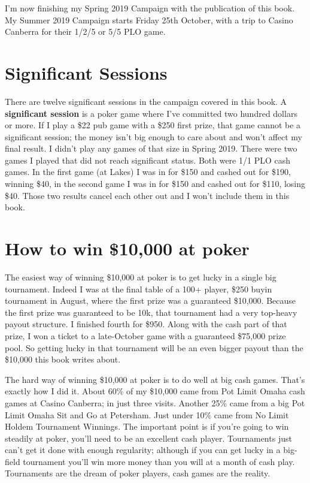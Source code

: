 I'm now finishing my Spring 2019 Campaign with the publication of this
book. My Summer 2019 Campaign starts Friday 25th October, with a trip
to Casino Canberra for their 1/2/5 or 5/5 PLO game.

\section*{Significant Sessions}


There are twelve significant sessions in the campaign covered in this
book. A \textbf{significant session} is a poker game where I've
committed two hundred dollars or more. If I play a \$22 pub game with
a \$250 first prize, that game cannot be a significant session; the
money isn't big enough to care about and won't affect my final
result. I didn't play any games of that size in Spring 2019. There
were two games I played that did not reach significant status. Both
were 1/1 PLO cash games. In the first game (at Lakes) I was in for
\$150 and cashed out for \$190, winning \$40, in the second game I was
in for \$150 and cashed out for \$110, losing \$40. Those two results
cancel each other out and I won't include them in this book.


\section*{How to win \$10,000 at poker}

The easiest way of winning \$10,000 at poker is to get lucky in a
single big tournament. Indeed I was at the final table of a 100+
player, \$250 buyin tournament in August, where the first prize was a
guaranteed \$10,000. Because the first prize was guaranteed to be 10k,
that tournament had a very top-heavy payout structure. I finished
fourth for \$950. Along with the cash part of that prize, I won a
ticket to a late-October game with a guaranteed \$75,000 prize
pool. So getting lucky in that tournament will be an even bigger
payout than the \$10,000 this book writes about.

The hard way of winning \$10,000 at poker is to do well at big cash
games. That's exactly how I did it. About 60\% of my \$10,000 came
from Pot Limit Omaha cash games at Casino Canberra; in just three
visits. Another 25\% came from a big Pot Limit Omaha Sit and Go at
Petersham. Just under 10\% came from No Limit Holdem Tournament
Winnings. The important point is if you're going to win steadily at
poker, you'll need to be an excellent cash player. Tournaments just
can't get it done with enough regularity; although if you can get
lucky in a big-field tournament you'll win more money than you will at
a month of cash play. Tournaments are the dream of poker players, cash
games are the reality.

